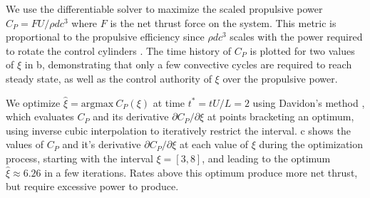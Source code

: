 \documentclass[10pt,a4paper]{article}
\begin{document}
We use the differentiable solver to maximize the scaled propulsive power $C_P = FU/\rho dc^3$ where $F$ is the net thrust force on the system. This metric is  proportional to the propulsive efficiency since $\rho dc^3$ scales with the power required to rotate the control cylinders \citep{Schulmeister2017}. The time history of $C_P$ is plotted for two values of $\xi$ in b, demonstrating that only a few convective cycles are required to reach steady state, as well as the control authority of $\xi$ over the propulsive power.

We optimize $\hat\xi=\text{argmax}\ C_P(\xi)$ at time $t^*=tU/L=2$ using Davidon's method \citep{Davidon1991}, which evaluates $C_P$ and its derivative $\partial C_P/\partial \xi$ at points bracketing an optimum, using inverse cubic interpolation to iteratively restrict the interval. c shows the values of $C_P$ and it's derivative $\partial C_P/\partial \xi$ at each value of $\xi$ during the optimization process, starting with the interval $\xi=[3,8]$, and leading to the optimum $\hat\xi\approx 6.26$ in a few iterations. Rates above this optimum produce more net thrust, but require excessive power to produce.
\end{document}
